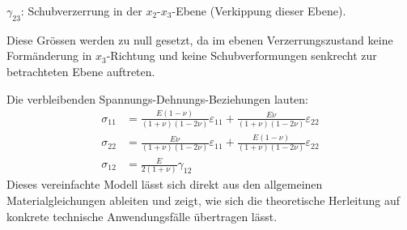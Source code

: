 $\gamma_{23}$: Schubverzerrung in der $x_2$-$x_3$-Ebene (Verkippung dieser Ebene).

Diese Grössen werden zu null gesetzt, da im ebenen Verzerrungszustand
keine Formänderung in $x_3$-Richtung und keine Schubverformungen
senkrecht zur betrachteten Ebene auftreten.

Die verbleibenden Spannungs-Dehnungs-Beziehungen lauten:
\begin{align*}
	\sigma_{11} &=	\frac{E (1-\nu)}{(1+\nu)(1-2\nu)} \varepsilon_{11} + \frac{E \nu}{(1+\nu)(1-2\nu)} \varepsilon_{22}
	\\
	\sigma_{22} &=	\frac{E \nu}{(1+\nu)(1-2\nu)} \varepsilon_{11} + \frac{E (1-\nu)}{(1+\nu)(1-2\nu)} \varepsilon_{22}
	\\
	\sigma_{12} &=	\frac{E}{2(1+\nu)} \gamma_{12}
\end{align*}
Dieses vereinfachte Modell lässt sich direkt aus den allgemeinen
Materialgleichungen ableiten und zeigt, wie sich die theoretische
Herleitung auf konkrete technische Anwendungsfälle übertragen lässt.
